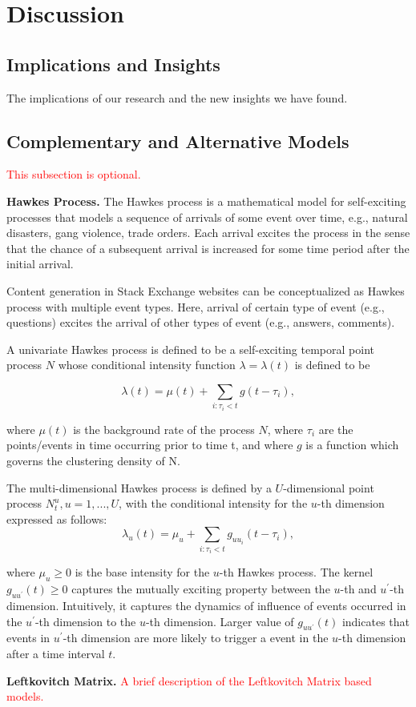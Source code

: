 \section{Discussion}
\subsection{Implications and Insights}
The implications of our research and the new insights we have found.

\subsection{Complementary and Alternative Models}
\textcolor{red}{This subsection is optional.}

\textbf{Hawkes Process.} The Hawkes process is a mathematical model for self-exciting processes that models a sequence of arrivals of some event over time, e.g., natural disasters, gang violence, trade orders.  Each arrival excites the process in the sense that the chance of a subsequent arrival is increased for some time period after the initial arrival. 

Content generation in Stack Exchange websites can be conceptualized as Hawkes process with multiple event types. Here, arrival of certain type of event (e.g., questions) excites the arrival of other types of event (e.g., answers, comments). 

A univariate Hawkes process is defined to be a self-exciting temporal point process $N$ whose conditional intensity function $\lambda = \lambda(t)$ is defined to be

 $$\lambda(t) = \mu(t)+\sum_{i:\tau_i<t}g(t-\tau_i),$$
 
where $\mu(t)$ is the background rate of the process  $N$, where $\tau_i$ are the points/events in time occurring prior to time t, and where $g$ is a function which governs the clustering density of N. 

The multi-dimensional Hawkes process is defined by a $U$-dimensional point process $N_t^u, u =1, . . . , U$, with the conditional intensity for the $u$-th dimension expressed as follows:
$$\lambda_u(t) = \mu_u + \sum_{i:\tau_i<t} g_{uu_i}(t-\tau_i),$$

where $\mu_u \ge 0$ is the base intensity for the $u$-th Hawkes process. The kernel $g_{uu^\prime}(t) \ge 0$ captures the mutually exciting property between the $u$-th and $u^\prime$-th dimension. Intuitively, it captures the dynamics of influence of events occurred in the $u^\prime$-th dimension to the $u$-th dimension. Larger value of $g_{uu^\prime}(t)$  indicates that events in $u^\prime$-th dimension are more likely to trigger a event in the $u$-th dimension after a time interval $t$.

\textbf{Leftkovitch Matrix.} \textcolor{red}{A brief description of the Leftkovitch Matrix based models.}

